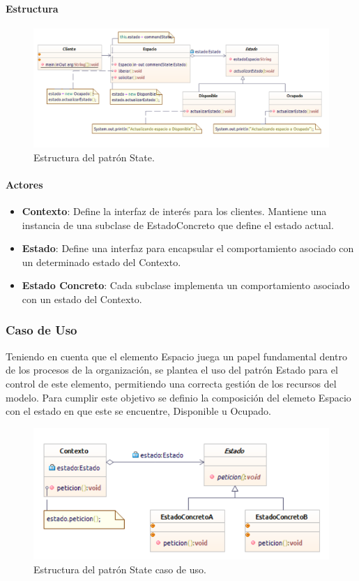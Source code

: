 \paragraph{Estructura}

\begin{figure}[th!]
	\centering
	\includegraphics[width=.7\linewidth]{imagenes/Patrones/State.pdf}
	\caption{Estructura del patrón State.\cite{gof}}	
\end{figure}

\paragraph{Actores}

\begin{itemize}
	\item \textbf{Contexto}: Define la interfaz de interés para los clientes. Mantiene una instancia de una subclase de EstadoConcreto que define el estado actual.
	\item \textbf{Estado}: Define una interfaz para encapsular el comportamiento asociado con un determinado estado del Contexto.
	\item \textbf{Estado Concreto}: Cada subclase implementa un comportamiento asociado con un estado del Contexto.
\end{itemize}


\subsubsection{Caso de Uso}
Teniendo en cuenta que el elemento Espacio juega un papel fundamental dentro de los procesos de la organización, se plantea el uso del patrón Estado para el control de este elemento, permitiendo una correcta gestión de los recursos del modelo. Para cumplir este objetivo se definio la composición del elemeto Espacio con el estado en que este se encuentre, Disponible u Ocupado.

\begin{figure}[th!]
	\centering
	\includegraphics[width=.7\linewidth]{imagenes/Patrones/State_caso.pdf}
	\caption{Estructura del patrón State caso de uso.\cite{gof}}	
\end{figure}

